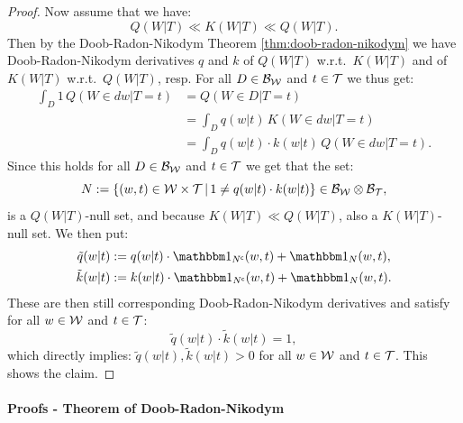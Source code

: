 \begin{Cor}
\begin{proof}
    Now assume that we have:
    \[ Q(W|T) \ll K(W|T) \ll Q(W|T).   \]
    Then by the Doob-Radon-Nikodym Theorem \ref{thm:doob-radon-nikodym} we have  Doob-Radon-Nikodym derivatives $q$ and $k$ of $Q(W|T)$ w.r.t.\ $K(W|T)$ and of
    $K(W|T)$ w.r.t.\ $Q(W|T)$, resp. For all $D \in \mathcal{B}_{\mathcal{W}}$ and $t \in \mathcal{T}$ we thus get:
    \begin{align*}
        \int_D 1 \, Q(W \in dw|T=t) &=  Q(W \in D|T=t) \\
                                    &=  \int_D q(w|t) \, K(W \in dw|T=t) \\
                                    &= \int_D q(w|t) \cdot k(w|t) \, Q(W \in dw|T=t).
    \end{align*}
    Since this holds for all $D \in \mathcal{B}_{\mathcal{W}}$ and $t \in \mathcal{T}$ we get that the set:
    \[ N:=\left \{ (w,t) \in \mathcal{W} \times \mathcal{T} \,\middle|\, 1 \neq q(w|t) \cdot k(w|t) \right \} \in \mathcal{B}_{\mathcal{W}} \otimes \mathcal{B}_{\mathcal{T}},  \]
    is a $Q(W|T)$-null set, and because $K(W|T) \ll Q(W|T)$, also a $K(W|T)$-null set.
    We then put:
    \begin{align} 
        \tilde q(w|t) &:= q(w|t) \cdot \I_{N^\cmpl}(w,t) + \I_N(w,t), \\
        \tilde k(w|t) &:= k(w|t) \cdot \I_{N^\cmpl}(w,t) + \I_N(w,t).
    \end{align}
    These are then still corresponding Doob-Radon-Nikodym derivatives and satisfy for all $w \in \mathcal{W}$ and $t \in \mathcal{T}$:
    \[ \tilde q(w|t) \cdot \tilde k(w|t) = 1,  \]
    which directly implies: $\tilde q(w|t), \tilde k(w|t) > 0$ for all $w \in \mathcal{W}$ and $t \in \mathcal{T}$. This shows the claim.
\end{proof}
\end{Cor}

\paragraph{Proofs - Theorem of Doob-Radon-Nikodym}

